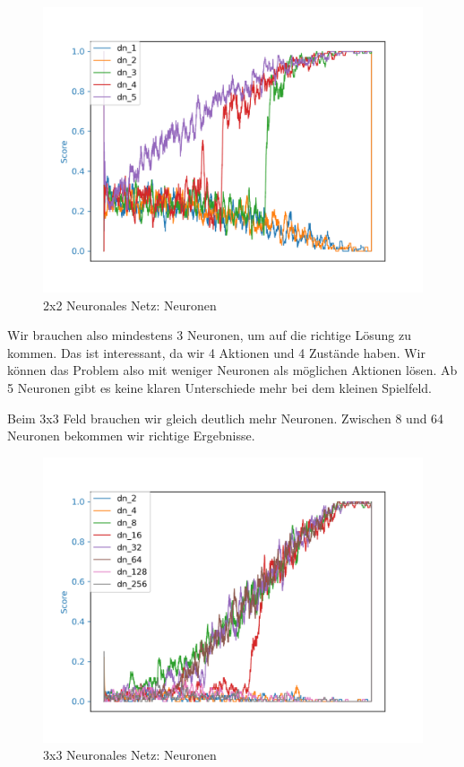 \begin{figure}[H]
\centering
\includegraphics[width=\textwidth]{Figures/2x2_dn_1_dn_2_dn_3_dn_4_dn_5.png}
\caption{2x2 Neuronales Netz: Neuronen}
\label{dn1}
\end{figure}

Wir brauchen also mindestens 3 Neuronen, um auf die richtige Lösung zu kommen. Das ist interessant, da wir 4 Aktionen und 4 Zustände haben. Wir können das Problem also mit weniger Neuronen als möglichen Aktionen lösen. Ab 5 Neuronen gibt es keine klaren Unterschiede mehr bei dem kleinen Spielfeld.

Beim 3x3 Feld brauchen wir gleich deutlich mehr Neuronen. Zwischen 8 und 64 Neuronen bekommen wir richtige Ergebnisse.

\begin{figure}[H]
\centering
\includegraphics[width=\textwidth]{Figures/3x3_dn_2_dn_4_dn_8_dn_16_dn_32_dn_64_dn_128_dn_256.png}
\caption{3x3 Neuronales Netz: Neuronen}
\label{dn2}
\end{figure}

